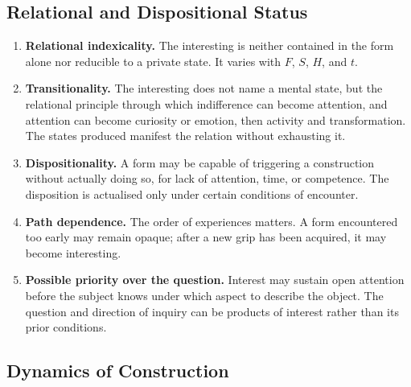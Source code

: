 \documentclass[11pt,a4paper]{article}
\begin{document}
\subsection{Relational and Dispositional Status}

\begin{enumerate}
  \item \textbf{Relational indexicality.} The interesting is neither contained
        in the form alone nor reducible to a private state. It varies with
        \(F\), \(S\), \(H\), and \(t\).
  \item \textbf{Transitionality.} The interesting does not name a mental state,
        but the relational principle through which indifference can become
        attention, and attention can become curiosity or emotion, then activity and
        transformation. The states produced manifest the relation without
        exhausting it.
  \item \textbf{Dispositionality.} A form may be capable of triggering a
        construction without actually doing so, for lack of attention, time, or
        competence. The disposition is actualised only under certain conditions
        of encounter.
  \item \textbf{Path dependence.} The order of experiences matters. A form
        encountered too early may remain opaque; after a new grip has been
        acquired, it may become interesting.
  \item \textbf{Possible priority over the question.} Interest may sustain
        open attention before the subject knows under which aspect to describe
        the object. The question and direction of inquiry can be products of
        interest rather than its prior conditions.
\end{enumerate}

\subsection{Dynamics of Construction}
\end{document}
